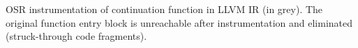 \label{fig:isordascto} OSR instrumentation of continuation function in LLVM IR (in grey). The original function entry block is unreachable after instrumentation and eliminated (struck-through code fragments).
